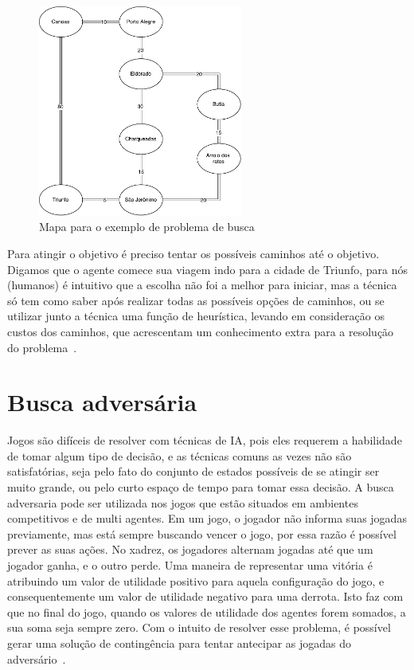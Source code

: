 \begin{figure}[ht]
	\centering
	\includegraphics[width=0.6\textwidth]{fig/mapabusca.pdf}
	\caption{Mapa para o exemplo de problema de busca}
	\label{fig:mapabusca}
\end{figure} 

Para atingir o objetivo é preciso tentar os possíveis caminhos até o objetivo. 
Digamos que o agente comece sua viagem indo para a cidade de Triunfo, para nós (humanos) é intuitivo que a escolha não foi a melhor para iniciar, mas a técnica só tem como saber após realizar todas as possíveis opções de caminhos, ou se utilizar junto a técnica uma função de heurística, levando em consideração os custos dos caminhos, que acrescentam um conhecimento extra para a resolução do problema~\cite[Capítulo 3]{intelligence2003modern}.

\section{Busca adversária}

Jogos são difíceis de resolver com técnicas de IA, pois eles requerem a habilidade de tomar algum tipo de decisão, e as técnicas comuns as vezes não são satisfatórias, seja pelo fato do conjunto de estados possíveis de se atingir ser muito grande, ou pelo curto espaço de tempo para tomar essa decisão.
A busca adversaria pode ser utilizada nos jogos que estão situados em ambientes competitivos e de multi agentes.
Em um jogo, o jogador não informa suas jogadas previamente, mas está sempre buscando vencer o jogo, por essa razão é possível prever as suas ações.
No xadrez, os jogadores alternam jogadas até que um jogador ganha, e o outro perde. Uma maneira de representar uma vitória é atribuindo um valor de utilidade positivo para aquela configuração do jogo, e consequentemente um valor de utilidade negativo para uma derrota. Isto faz com que no final do jogo, quando os valores de utilidade dos agentes forem somados, a sua soma seja sempre zero. 
Com o intuito de resolver esse problema, é possível gerar uma solução de contingência para tentar antecipar as jogadas do adversário~\cite[Capítulo 5]{intelligence2003modern}. 

